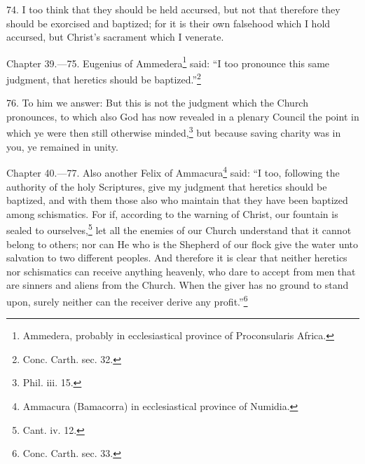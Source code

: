 74. I too think that they should be held accursed, but not that therefore they should be exorcised and baptized; for it is their own falsehood which I hold accursed, but Christ’s sacrament which I venerate.


Chapter 39.—75. Eugenius of Ammedera\footnote{\par  Ammedera, probably in ecclesiastical province of Proconsularis Africa.} said: ``I too pronounce this same judgment, that heretics should be baptized.''\footnote{\par  Conc. Carth. sec. 32.}

76. To him we answer: But this is not the judgment which the Church pronounces, to which also God has now revealed in a plenary Council the point in which ye were then still otherwise minded,\footnote{\par  Phil. iii. 15.} but because saving charity was in you, ye remained in unity.


Chapter 40.—77. Also another Felix of Ammacura\footnote{\par  Ammacura (Bamacorra) in ecclesiastical province of Numidia.} said: ``I too, following the authority of the holy Scriptures, give my judgment that heretics should be baptized, and with them those also who maintain that they have been baptized among schismatics. For if, according to the warning of Christ, our fountain is sealed to ourselves,\footnote{\par  Cant. iv. 12.} let all the enemies of our Church understand that it cannot belong to others; nor can He who is the Shepherd of our flock give the water unto salvation to two different peoples. And therefore it is clear that neither heretics nor schismatics can receive anything heavenly, who dare to accept from men that are sinners and aliens from the Church. When the giver has no ground to stand upon, surely neither can the receiver derive any profit.''\footnote{\par  Conc. Carth. sec. 33.}

